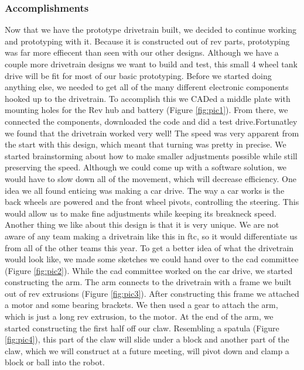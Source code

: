 \subsubsection*{Accomplishments}
Now that we have the prototype drivetrain built, we decided to continue working and prototyping with it. Because it is constructed out of rev parts, prototyping was far more effiecent than seen with our other designs. Although we have a couple more drivetrain designs we want to build and test, this small 4 wheel tank drive will be fit for most of our basic prototyping. Before we started doing anything else, we needed to get all of the many different electronic components hooked up to the drivetrain. To accomplish this we CADed a middle plate with mounting holes for the Rev hub and battery (Figure \ref{fig:pic1}). From there, we connected the components, downloaded the code and did a test drive.Fortunatley we found that the drivetrain worked very well! The speed was very apparent from the start with this design, which meant that turning was pretty in precise. We started brainstorming about how to make smaller adjustments possible while still preserving the speed. Although we could come up with a software solution, we would have to slow down all of the movement, which will decrease efficiency. One idea we all found enticing was making a car drive. The way a car works is the back wheels are powered and the front wheel pivots, controlling the steering. This would allow us to make fine adjustments while keeping its breakneck speed. Another thing we like about this design is that it is very unique. We are not aware of any team making a drivetrain like this in ftc, so it would differentiate us from all of the other teams this year. To get a better idea of what the drivetrain would look like, we made some sketches we could hand over to the cad committee (Figure \ref{fig:pic2}).
While the cad committee worked on the car drive, we started constructing the arm. The arm connects to the drivetrain with a frame we built out of rev extrusions (Figure \ref{fig:pic3}). After constructing this frame we attached a motor and some bearing brackets. We then used a gear to attach the arm, which is just a long rev extrusion, to the motor. At the end of the arm, we started constructing the first half off our claw. Resembling a spatula (Figure \ref{fig:pic4}), this part of the claw will slide under a block and another part of the claw, which we will construct at a future meeting, will pivot down and clamp a block or ball into the robot.
 

